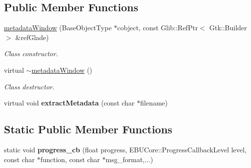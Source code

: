 \subsection*{Public Member Functions}
\begin{DoxyCompactItemize}
\item 
\hyperlink{classmetadataWindow_a85cef3fe02d23d3ef7d4b8ab79860075}{metadata\-Window} (Base\-Object\-Type $\ast$cobject, const Glib\-::\-Ref\-Ptr$<$ Gtk\-::\-Builder $>$ \&ref\-Glade)
\begin{DoxyCompactList}\small\item\em Class constructor. \end{DoxyCompactList}\item 
virtual \hyperlink{classmetadataWindow_a7170d48cd47c54261398987daeb55118}{$\sim$metadata\-Window} ()
\begin{DoxyCompactList}\small\item\em Class destructor. \end{DoxyCompactList}\item 
\hypertarget{classmetadataWindow_a02c2efcd387c97500bdaf89018b878e4}{virtual void {\bfseries extract\-Metadata} (const char $\ast$filename)}\label{classmetadataWindow_a02c2efcd387c97500bdaf89018b878e4}

\end{DoxyCompactItemize}
\subsection*{Static Public Member Functions}
\begin{DoxyCompactItemize}
\item 
\hypertarget{classmetadataWindow_ab73b0d3a9fbdcaefef689d39af0407b6}{static void {\bfseries progress\-\_\-cb} (float progress, E\-B\-U\-Core\-::\-Progress\-Callback\-Level level, const char $\ast$function, const char $\ast$msg\-\_\-format,...)}\label{classmetadataWindow_ab73b0d3a9fbdcaefef689d39af0407b6}

\end{DoxyCompactItemize}
